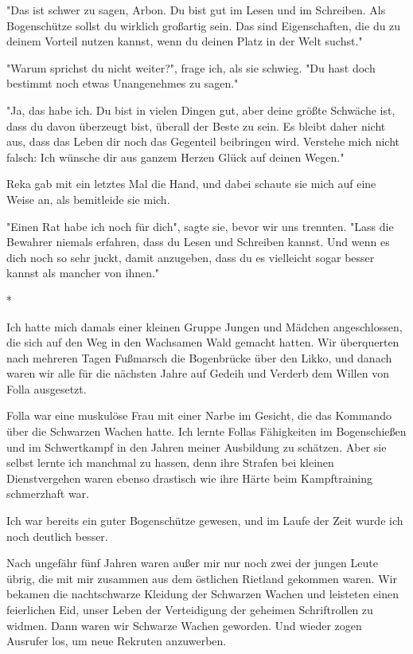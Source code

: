 \documentclass[10pt, a4paper, oneside]{book}
\begin{document}
\begin{multicols}{2}
"Das ist schwer zu sagen, Arbon. Du bist gut im Lesen und im Schreiben. Als Bogenschütze sollst du wirklich großartig sein. Das sind Eigenschaften, die du zu deinem Vorteil nutzen kannst, wenn du deinen Platz in der Welt suchst."

"Warum sprichst du nicht weiter?", frage ich, als sie schwieg. "Du hast doch bestimmt noch etwas Unangenehmes zu sagen."

"Ja, das habe ich. Du bist in vielen Dingen gut, aber deine größte Schwäche ist, dass du davon überzeugt bist, überall der Beste zu sein. Es bleibt daher nicht aus, dass das Leben dir noch das Gegenteil beibringen wird. Verstehe mich nicht falsch: Ich wünsche dir aus ganzem Herzen Glück auf deinen Wegen."

Reka gab mit ein letztes Mal die Hand, und dabei schaute sie mich auf eine Weise an, als bemitleide sie mich.

"Einen Rat habe ich noch für dich", sagte sie, bevor wir uns trennten. "Lass die Bewahrer niemals erfahren, dass du Lesen und Schreiben kannst. Und wenn es dich noch so sehr juckt, damit anzugeben, dass du es vielleicht sogar besser kannst als mancher von ihnen."

\begin{center}
    *
\end{center}

Ich hatte mich damals einer kleinen Gruppe Jungen und Mädchen angeschlossen, die sich auf den Weg in den Wachsamen Wald gemacht hatten. Wir überquerten nach mehreren Tagen Fußmarsch die Bogenbrücke über den Likko, und danach waren wir alle für die nächsten Jahre auf Gedeih und Verderb dem Willen von Folla ausgesetzt.

Folla war eine muskulöse Frau mit einer Narbe im Gesicht, die das Kommando über die Schwarzen Wachen hatte. Ich lernte Follas Fähigkeiten im Bogenschießen und im Schwertkampf in den Jahren meiner Ausbildung zu schätzen. Aber sie selbst lernte ich manchmal zu hassen, denn ihre Strafen bei kleinen Dienstvergehen waren ebenso drastisch wie ihre Härte beim Kampftraining schmerzhaft war.

Ich war bereits ein guter Bogenschütze gewesen, und im Laufe der Zeit wurde
ich noch deutlich besser.

Nach ungefähr fünf Jahren waren außer mir nur noch zwei der jungen Leute übrig, die mit mir zusammen aus dem östlichen Rietland gekommen waren. Wir bekamen die nachtschwarze Kleidung der Schwarzen Wachen und leisteten einen feierlichen Eid, unser Leben der Verteidigung der geheimen Schriftrollen zu widmen. Dann waren wir Schwarze Wachen geworden. Und wieder zogen Ausrufer los, um neue Rekruten anzuwerben.


\end{multicols}
\end{document}
